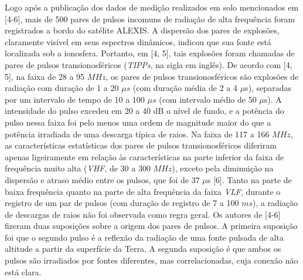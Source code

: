 \documentclass[a4paper, 12pt, onecolumn,singlespacing]{article}
\begin{document}
	Logo após a publicação dos dados de medição realizados em solo mencionados em [4-6], mais de 500 pares de pulsos incomuns de radiação de alta frequência foram registrados a bordo do satélite ALEXIS. A dispersão dos pares de explosões, claramente visível em seus espectros dinâmicos, indicou que sua fonte está localizada sob a ionosfera. Portanto, em [4, 5], tais explosões foram chamadas de pares de pulsos transionosféricos (\textit{TIPPs}, na sigla em inglês). De acordo com [4, 5], na faixa de 28 a 95 $MHz$, os pares de pulsos transionosféricos são explosões de radiação com duração de 1 a 20 $\mu s$ (com duração média de 2 a 4 $\mu$s), separadas por um intervalo de tempo de 10 a 100 $\mu s$ (com intervalo médio de 50 $\mu$s). A intensidade do pulso excedeu em 20 a 40 dB o nível de fundo, e a potência do pulso nessa faixa foi pelo menos uma ordem de magnitude maior do que a potência irradiada de uma descarga típica de raios. Na faixa de 117 a 166 $MHz$, as características estatísticas dos pares de pulsos transionosféricos diferiram apenas ligeiramente em relação às características na parte inferior da faixa de frequência muito alta (\textit{VHF}, de 30 a 300 $MHz$), exceto pela diminuição na dispersão e atraso médio entre os pulsos, que foi de 37 $\mu$s [6]. Tanto na parte de baixa frequência quanto na parte de alta frequência da faixa \textit{VLF}, durante o registro de um par de pulsos (com duração de registro de 7 a 100 $ms$), a radiação de descargas de raios não foi observada como regra geral. Os autores de [4-6] fizeram duas suposições sobre a origem dos pares de pulsos. A primeira suposição foi que o segundo pulso é a reflexão da radiação de uma fonte pulsada de alta altitude a partir da superfície da Terra. A segunda suposição é que ambos os pulsos são irradiados por fontes diferentes, mas correlacionadas, cuja conexão não está clara.
	
\end{document}
